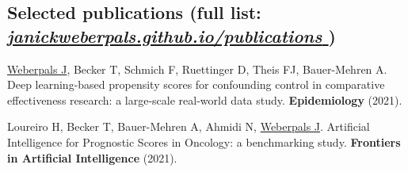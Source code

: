 \documentclass[letterpaper]{twentysecondcv} %
\begin{document}

\subsection{Selected publications \small(full list: \href{https://janickweberpals.github.io/publications}{\textit{janickweberpals.github.io/publications \ExternalLink}})}


\underline{Weberpals J}, Becker T, Schmich F, Ruettinger D, Theis FJ, Bauer-Mehren A. Deep learning-based propensity scores for confounding control in comparative effectiveness research: a large-scale real-world data study. \textbf{Epidemiology} (2021).%

Loureiro H, Becker T, Bauer-Mehren A, Ahmidi N, \underline{Weberpals J}. Artificial Intelligence for Prognostic Scores in Oncology: a benchmarking study. \textbf{Frontiers in Artificial Intelligence} (2021). %





%
%
\end{document}
